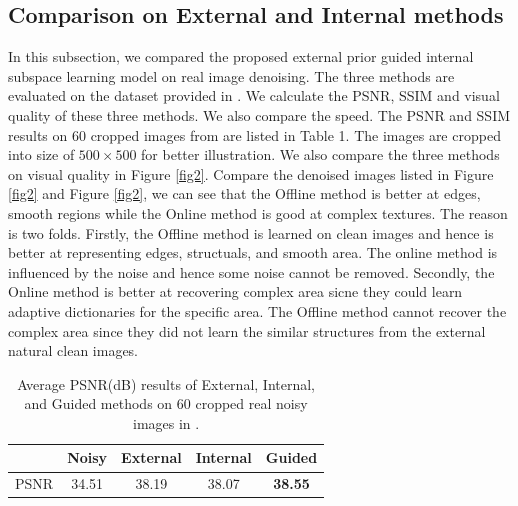 \documentclass[10pt,twocolumn,letterpaper]{article}
\begin{document}
\subsection{Comparison on External and Internal methods}
In this subsection, we compared the proposed external prior guided internal subspace learning model on real image denoising. The three methods are evaluated on the dataset provided in \cite{crosschannel2016}. We calculate the PSNR, SSIM \cite{ssim} and visual quality of these three methods. We also compare the speed. The PSNR and SSIM results on 60 cropped images from \cite{crosschannel2016} are listed in Table 1. The images are cropped into size of $500\times 500$ for better illustration. We also compare the three methods on visual quality in Figure \ref{fig2}. Compare the denoised images listed in Figure \ref{fig2} and Figure \ref{fig2}, we can see that the Offline method is better at edges, smooth regions while the Online method is good at complex textures. The reason is two folds. Firstly, the Offline method is learned on clean images and hence is better at representing edges, structuals, and smooth area. The online method is influenced by the noise and hence some noise cannot be removed. Secondly, the Online method is better at recovering complex area sicne they could learn adaptive dictionaries for the specific area. The Offline method cannot recover the complex area since they did not learn the similar structures from the external natural clean images.

\begin{table}\label{tab1}
\caption{Average PSNR(dB) results of External, Internal, and Guided methods on 60 cropped real noisy images in \cite{crosschannel2016}.}
\label{tab1}
\begin{center}
\renewcommand\arraystretch{1}
\begin{tabular}{|c||c|c|c|c|}
\hline
 & \textbf{Noisy} &\textbf{External} &\textbf{Internal} &\textbf{Guided}  
\\
\hline
PSNR & 34.51 & 38.19 & 38.07 & \textbf{38.55} 
\\
\hline
\end{tabular}
\end{center}
\end{table}
\end{document}
